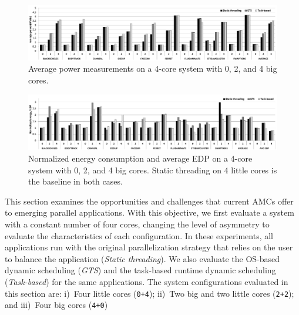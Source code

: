 \begin{figure}[t]%
	\centering
	\includegraphics[width=1.0\textwidth]{figures/power4.pdf}
	\caption{Average power measurements on a 4-core system with 0, 2, and 4 big cores.}
	\label{fig:power4}%
\end{figure}

\begin{figure}[t]%
	\centering
	\includegraphics[width=1.0\textwidth]{figures/energy_EDP-4.pdf}
	\caption{Normalized energy consumption and average EDP on a 4-core system with 0, 2, and 4 big cores. Static threading on 4 little cores is the baseline in both cases. }
	\label{fig:energy4}%
\end{figure}



This section examines the opportunities and challenges that current AMCs offer to emerging parallel applications. With this objective, we first evaluate a system with a constant number of four cores, changing the level of asymmetry to evaluate the characteristics of each configuration. In these experiments, all applications run with the original parallelization strategy that relies on the user to balance the application (\emph{Static threading}). We also evaluate the OS-based dynamic scheduling (\emph{GTS}) and the task-based runtime dynamic scheduling (\emph{Task-based}) for the same applications. 
The system configurations evaluated in this section are:
i)~Four little cores (\texttt{0+4}); ii)~Two big and two little cores (\texttt{2+2}); and iii)~Four 
big cores (\texttt{4+0})

